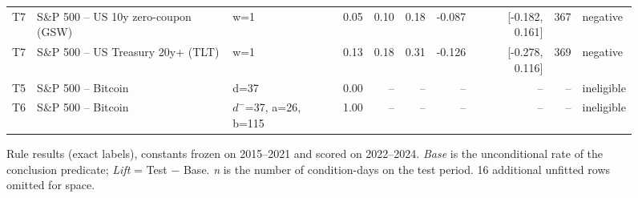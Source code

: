 \begin{figure}[t]
{\begin{tabular}{lllrrrrrrl}
T7 & S\&P 500 -- US 10y zero-coupon (GSW) & w=1 & 0.05 & 0.10 & 0.18 & -0.087 & [-0.182, 0.161] & 367 & negative \\
T7 & S\&P 500 -- US Treasury 20y+ (TLT) & w=1 & 0.13 & 0.18 & 0.31 & -0.126 & [-0.278, 0.116] & 369 & negative \\
T5 & S\&P 500 -- Bitcoin & d=37 & 0.00 & -- & -- & -- & -- & -- & ineligible \\
T6 & S\&P 500 -- Bitcoin & $d^-$=37, a=26, b=115 & 1.00 & -- & -- & -- & -- & -- & ineligible \\
\bottomrule
\end{tabular}
}
\caption{Rule results (exact labels), constants frozen on 2015--2021 and scored on 2022--2024. \emph{Base} is the unconditional rate of the conclusion predicate; \emph{Lift} = Test $-$ Base. \emph{n} is the number of condition-days on the test period. 16 additional unfitted rows omitted for space.}
\label{fig:rule-results-pub}
\end{figure}

